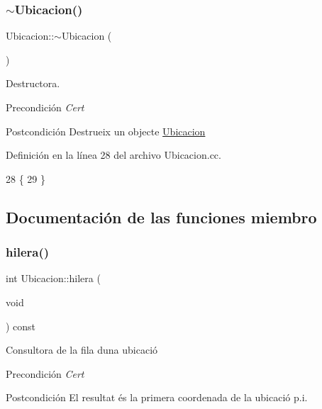 \subsubsection{\texorpdfstring{$\sim$\+Ubicacion()}{~Ubicacion()}}
{\footnotesize\ttfamily Ubicacion\+::$\sim$\+Ubicacion (\begin{DoxyParamCaption}{ }\end{DoxyParamCaption})}



Destructora. 

\begin{DoxyPrecond}{Precondición}
{\itshape Cert} 
\end{DoxyPrecond}
\begin{DoxyPostcond}{Postcondición}
Destrueix un objecte \hyperlink{class_ubicacion}{Ubicacion} 
\end{DoxyPostcond}


Definición en la línea 28 del archivo Ubicacion.\+cc.


\begin{DoxyCode}
28                       \{
29 \}
\end{DoxyCode}


\subsection{Documentación de las funciones miembro}
\mbox{\label{class_ubicacion_abf00d08075e75ac833de7357ebc6f521}} 
\subsubsection{\texorpdfstring{hilera()}{hilera()}}
{\footnotesize\ttfamily int Ubicacion\+::hilera (\begin{DoxyParamCaption}\item[{void}]{ }\end{DoxyParamCaption}) const}



Consultora de la fila d\textquotesingle{}una ubicació 

\begin{DoxyPrecond}{Precondición}
{\itshape Cert} 
\end{DoxyPrecond}
\begin{DoxyPostcond}{Postcondición}
El resultat és la primera coordenada de la ubicació p.\+i. 
\end{DoxyPostcond}


